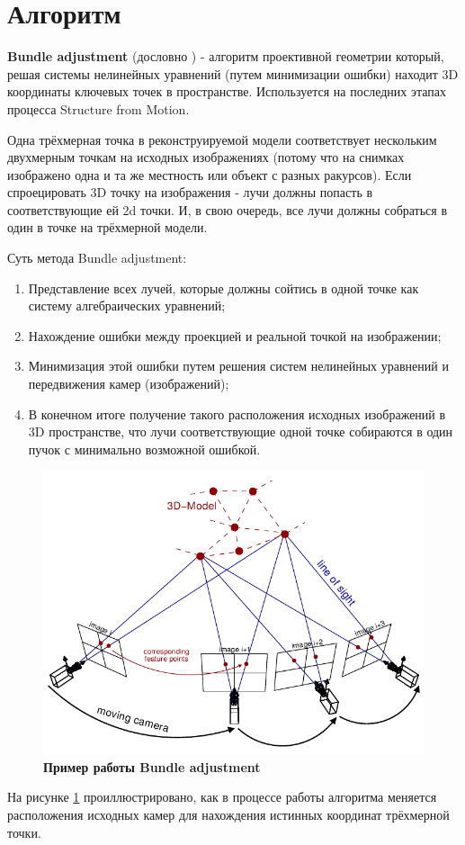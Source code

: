\section{Алгоритм }

\textbf{Bundle adjustment} (дословно ) - алгоритм проективной геометрии который, решая системы нелинейных уравнений (путем минимизации ошибки) находит 3D координаты ключевых точек в пространстве. Используется на последних этапах процесса Structure from Motion.
 
Одна трёхмерная точка в реконструируемой модели соответствует нескольким двухмерным точкам на исходных изображениях (потому что на снимках изображено одна и та же местность или объект с разных ракурсов). Если спроецировать 3D точку на изображения - лучи должны попасть в соответствующие ей 2d точки. И, в свою очередь, все лучи должны собраться в один  в точке на трёхмерной модели.

\vspace{1mm}
Суть метода Bundle adjustment:

\begin{enumerate}
    \item Представление всех лучей, которые должны сойтись в одной точке как систему алгебраических уравнений;
    \item Нахождение ошибки между проекцией и реальной точкой на изображении;
    \item Минимизация этой ошибки путем решения систем нелинейных уравнений и передвижения камер (изображений);
    \item В конечном итоге получение такого расположения исходных изображений в 3D пространстве, что лучи соответствующие одной точке собираются в один пучок с минимально возможной ошибкой.
\end{enumerate}

\begin{figure}[h]
    \centering
    \includegraphics[width=1\textwidth]{images/bundle_adjustment.png}
    \caption{\textbf{Пример работы Bundle adjustment}}
    \label{fig:ba}
\end{figure}

На рисунке \ref{fig:ba} проиллюстрировано, как в процессе работы алгоритма меняется расположения исходных камер для нахождения истинных координат трёхмерной точки.
